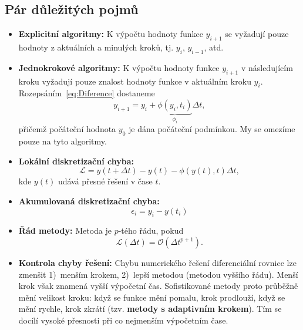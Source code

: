 \documentclass[a4paper,11pt,twoside]{article}
\theoremstyle{red}
\theoremstyle{green}
\begin{document}
\subsection{Pár důležitých pojmů}
    \begin{itemize}
        \item{\bf Explicitní algoritmy:}
        K výpočtu hodnoty funkce $y_{i+1}$ se vyžadují pouze hodnoty z aktuálních a minulých kroků, tj. $y_{i}$, $y_{i-1}$, atd.

        \item {\bf Jednokrokové algoritmy:}
        K výpočtu hodnoty funkce $y_{i+1}$ v následujícím kroku vyžadují pouze znalost hodnoty funkce v aktuálním kroku $y_{i}$.
        Rozepsáním~\eqref{eq:Diference} dostaneme
        \begin{equation}
            \label{eq:phi}
            \boxed{
                y_{i+1}=y_{i}+\underbrace{\phi(y_{i},t_{i})}_{\phi_{i}}\Delta t
            },
        \end{equation}
        přičemž počáteční hodnota $y_{0}$ je dána počáteční podmínkou.
        My se omezíme pouze na tyto algoritmy.

        \item {\bf Lokální diskretizační chyba:}
        \begin{equation}
            \mathcal{L}=y(t+\Delta t)-y(t)-\phi(y(t),t)\Delta t,
        \end{equation}        
        kde $y(t)$ udává přesné řešení v čase $t$.

        \item {\bf Akumulovaná diskretizační chyba:}
        \begin{equation}
            \label{eq:AkumulovanaChyba}
            \epsilon_{i}=y_{i}-y(t_{i})
        \end{equation}

        \item {\bf Řád metody:} 
        Metoda je $p$-tého řádu, pokud
        \begin{equation}\label{eq:RadMetodyODR}
            \mathcal{L}(\Delta t)=\mathcal{O}(\Delta t^{p+1}).
        \end{equation}

        \item {\bf Kontrola chyby řešení:}
        Chybu numerického řešení diferenciální rovnice lze zmenšit 1)~menším krokem, 2)~lepší metodou (metodou vyššího řádu). 
        Menší krok však znamená vyšší výpočetní čas.
        Sofistikované metody proto průběžně mění velikost kroku: když se funkce mění pomalu, krok prodlouží, když se mění rychle, krok zkrátí (tzv. {\bf metody s adaptivním krokem}).
        Tím se docílí vysoké přesnosti při co nejmenším výpočetním čase.
    \end{itemize}
\end{document}
